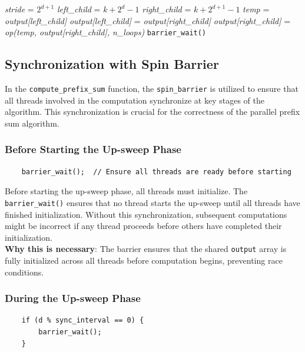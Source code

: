 \documentclass[letterpaper,12pt]{article}
\theoremstyle{remark}
\begin{document}
\begin{algorithmic}[1]
        \State \textit{stride} = $2^{d+1}$
            \State \textit{left\_child} = $k + 2^d - 1$
            \State \textit{right\_child} = $k + 2^{d+1} - 1$
                \State \textit{temp} = \textit{output[left\_child]}
                \State \textit{output[left\_child]} = \textit{output[right\_child]}
                \State \textit{output[right\_child]} = \textit{op(temp, output[right\_child], n\_loops)}
            \EndIf
        \EndFor
            \State \texttt{barrier\_wait()}
        \EndIf
    \EndFor
    
    \State \Return
\EndFunction
\end{algorithmic}



\subsection{Synchronization with Spin Barrier}
In the \texttt{compute\_prefix\_sum} function, the \texttt{spin\_barrier} is utilized to ensure that all threads involved in the computation synchronize at key stages of the algorithm. This synchronization is crucial for the correctness of the parallel prefix sum algorithm. 
\subsubsection{Before Starting the Up-sweep Phase}
\begin{verbatim}
    barrier_wait();  // Ensure all threads are ready before starting
\end{verbatim}
Before starting the up-sweep phase, all threads must initialize. The \texttt{barrier\_wait()} ensures that no thread starts the up-sweep until all threads have finished initialization. Without this synchronization, subsequent computations might be incorrect if any thread proceeds before others have completed their initialization.\\
\textbf{Why this is necessary}: The barrier ensures that the shared \texttt{output} array is fully initialized across all threads before computation begins, preventing race conditions.

\subsubsection{During the Up-sweep Phase}
\begin{verbatim}
    if (d % sync_interval == 0) {
        barrier_wait();
    }
\end{verbatim}
\end{document}
